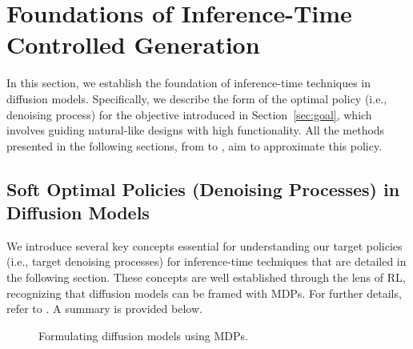 
{ \section{Foundations of Inference-Time Controlled Generation}\label{sec:foundation}
} 

In this section, we establish the foundation of inference-time techniques in diffusion models. Specifically, we describe the form of the optimal policy (i.e., denoising process) for the objective introduced in Section~\ref{sec:goal}, which involves guiding natural-like designs with high functionality. All the methods presented in the following sections, from  to , aim to approximate this policy.


\subsection{Soft Optimal Policies (Denoising Processes) in Diffusion Models}\label{sec:soft}

We introduce several key concepts essential for understanding our target policies (i.e., target denoising processes) for inference-time techniques that are detailed in the following section. These concepts are well established through the lens of RL, recognizing that diffusion models can be framed with MDPs. For further details, refer to \citet[Section 3]{uehara2024understanding}. A summary is provided below.

\begin{figure}[!th]
\centering
{}
\caption{Formulating diffusion models using MDPs.}
\end{figure}


